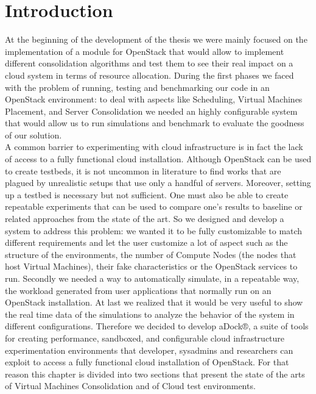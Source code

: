 




\section{Introduction}
\label{sec:sota_intro}
At the beginning of the development of the thesis we were mainly focused on the implementation of a module for OpenStack that would allow to implement different consolidation algorithms and test them to see their real impact on a cloud system in terms of resource allocation. During the first phases we faced with the problem of running, testing and benchmarking our code in an OpenStack environment: to deal with aspects like Scheduling, Virtual Machines Placement, and Server Consolidation we needed an highly configurable system that would allow us to run simulations and benchmark to evaluate the goodness of our solution.\\ 
A common barrier to experimenting with cloud infrastructure is in fact the lack of access to a fully functional cloud installation. Although OpenStack can be used to create testbeds, it is not uncommon in literature to find works that are plagued by unrealistic setups that use only a handful of servers. Moreover, setting up a testbed is necessary but not sufficient. One must also be able to create repeatable experiments that can be used to compare one’s results to baseline or related approaches from the state of the art.
So we designed and develop a system to address this problem: we wanted it to be fully customizable to match different requirements and let the user customize a lot of aspect such as the structure of the environments, the number of Compute Nodes (the nodes that host Virtual Machines), their fake characteristics or the OpenStack services to run. Secondly we needed a way to automatically simulate, in a repeatable way, the workload generated from user applications that normally run on an OpenStack installation. At last we realized that it would be very useful to show the real time data of the simulations to analyze the behavior of the system in different configurations.
Therefore we decided to develop aDock®, a suite of tools for creating performance, sandboxed, and configurable cloud infrastructure experimentation environments that developer, sysadmins and researchers can exploit to access a fully functional cloud installation of OpenStack.
For that reason this chapter is divided into two sections that present the state of the arts of Virtual Machines Consolidation and of Cloud test environments.


